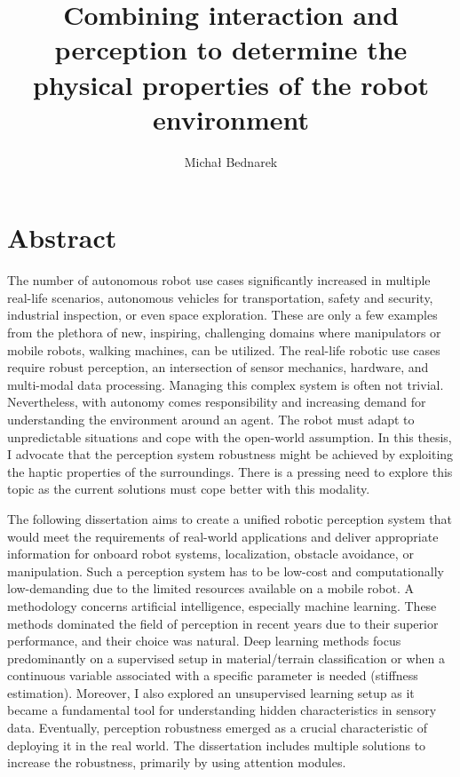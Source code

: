 \documentclass[a4paper, 10pt, twoside]{report}
\title{Combining interaction and perception to determine the physical properties of the robot environment}
\author{Michał Bednarek}
\begin{document}
\maketitle
{}
\tableofcontents

\chapter*{Abstract}
\label{sec:abstract}

The number of autonomous robot use cases significantly increased in multiple real-life scenarios, \eg autonomous vehicles for transportation, safety and security, industrial inspection, or even space exploration. These are only a few examples from the plethora of new, inspiring, challenging domains where manipulators or mobile robots, \eg walking machines, can be utilized. The real-life robotic use cases require robust perception, an intersection of sensor mechanics, hardware, and multi-modal data processing. Managing this complex system is often not trivial. Nevertheless, with autonomy comes responsibility and increasing demand for understanding the environment around an agent. The robot must adapt to unpredictable situations and cope with the open-world assumption. In this thesis, I advocate that the perception system robustness might be achieved by exploiting the haptic properties of the surroundings. There is a pressing need to explore this topic as the current solutions must cope better with this modality.

The following dissertation aims to create a unified robotic perception system that would meet the requirements of real-world applications and deliver appropriate information for onboard robot systems, \eg localization, obstacle avoidance, or manipulation. Such a perception system has to be low-cost and computationally low-demanding due to the limited resources available on a mobile robot. A methodology concerns artificial intelligence, especially machine learning. These methods dominated the field of perception in recent years due to their superior performance, and their choice was natural. Deep learning methods focus predominantly on a supervised setup in material/terrain classification or when a continuous variable associated with a specific parameter is needed (\eg stiffness estimation). Moreover, I also explored an unsupervised learning setup as it became a fundamental tool for understanding hidden characteristics in sensory data. Eventually, perception robustness emerged as a crucial characteristic of deploying it in the real world. The dissertation includes multiple solutions to increase the robustness, primarily by using attention modules.
\end{document}
